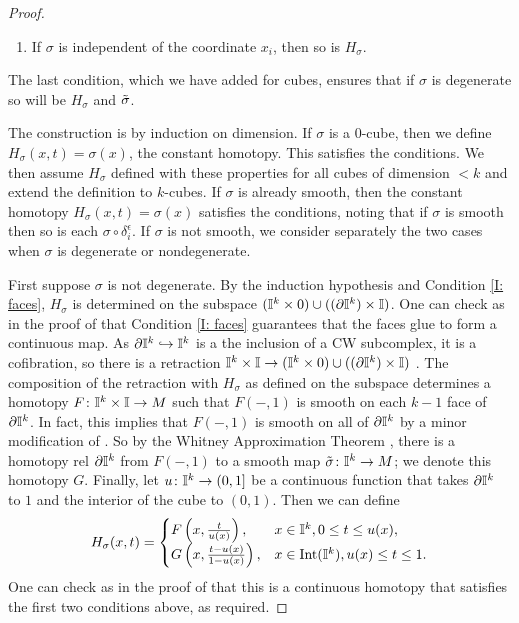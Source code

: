 \begin{proof}
\begin{enumerate}
		\item\label{I: degen} If $\sigma$ is independent of the coordinate $x_i$, then so is $H_\sigma$.
	\end{enumerate}

	The last condition, which we have added for cubes, ensures that if $\sigma$ is degenerate so will be $H_\sigma$ and $\tilde \sigma$.

	The construction is by induction on dimension.
	If $\sigma$ is a $0$-cube, then we define $H_\sigma(x,t) = \sigma(x)$, the constant homotopy.
	This satisfies the conditions.
	We then assume $H_\sigma$ defined with these properties for all cubes of dimension $<k$ and extend the definition to $k$-cubes.
	If $\sigma$ is already smooth, then the constant homotopy $H_\sigma(x,t) = \sigma(x)$ satisfies the conditions, noting that if $\sigma$ is smooth then so is each $\sigma \circ \delta_i^\epsilon$.
	If $\sigma$ is not smooth, we consider separately the two cases when $\sigma$ is degenerate or nondegenerate.

	First suppose $\sigma$ is not degenerate.
	By the induction hypothesis and Condition \eqref{I: faces}, $H_\sigma$ is determined on the subspace $(\mathbb{I}^k \times 0) \cup ((\partial \mathbb{I}^k) \times \mathbb{I})$.
	One can check as in the proof of \cite[Lemma 18.8]{Lee13} that Condition \eqref{I: faces} guarantees that the faces glue to form a continuous map.
	As $\partial \mathbb{I}^k \hookrightarrow \mathbb{I}^k$ is a the inclusion of a CW subcomplex, it is a cofibration, so there is a retraction $\mathbb{I}^k \times \mathbb{I} \to (\mathbb{I}^k \times 0) \cup ((\partial \mathbb{I}^k) \times \mathbb{I})$ \cite[Theorem VII.1.3]{Bred97}.
	The composition of the retraction with $H_\sigma$ as defined on the subspace determines a homotopy $F \colon \mathbb{I}^k \times \mathbb{I} \to M$ such that $F(-,1)$ is smooth on each $k-1$ face of $\partial \mathbb{I}^k$.
	In fact, this implies that $F(-,1)$ is smooth on all of $\partial \mathbb{I}^k$ by a minor modification of \cite[Lemma 18.9]{Lee13}.
	So by the Whitney Approximation Theorem \cite[Theorem 6.26]{Lee13}, there is a homotopy rel $\partial \mathbb{I}^k$ from $F(-,1)$ to a smooth map $\tilde \sigma \colon \mathbb{I}^k \to M$; we denote this homotopy $G$.
	Finally, let $u \colon \mathbb{I}^k \to (0,1]$ be a continuous function that takes $\partial\mathbb{I}^k$ to $1$ and the interior of the cube to $(0,1)$.
	Then we can define
	\begin{equation*}
		H_\sigma(x,t) =
		\begin{cases}
			F\left(x,\frac{t}{u(x)}\right),&x \in \mathbb{I}^k, 0 \leq t \leq u(x),\\
			G\left(x,\frac{t-u(x)}{1-u(x)}\right),&x \in \text{Int}(\mathbb{I}^k), u(x) \leq t \leq 1.\\
		\end{cases}
	\end{equation*}
	One can check as in the proof of \cite[Lemma 18.8]{Lee13} that this is a continuous homotopy that satisfies the first two conditions above, as required.


\end{proof}
